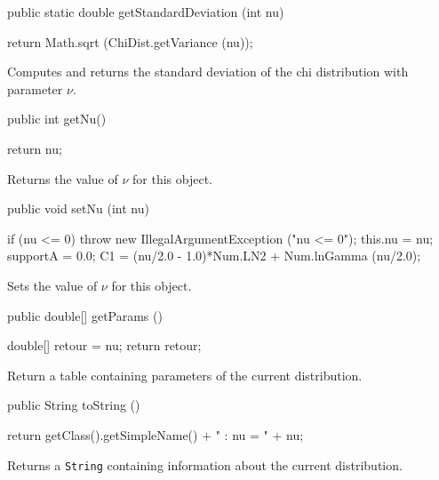 \begin{code}

   public static double getStandardDeviation (int nu)\begin{hide} {
      return Math.sqrt (ChiDist.getVariance (nu));
   }\end{hide}
\end{code}
\begin{tabb}  Computes and returns the standard deviation of the chi distribution
   with parameter $\nu$.
\end{tabb}
\begin{htmlonly}
\end{htmlonly}
\begin{code}

   public int getNu()\begin{hide} {
      return nu;
   }
\end{hide}
\end{code}
  \begin{tabb}
  Returns the value of $\nu$ for this object.
 \end{tabb}
\begin{code}

   public void setNu (int nu)\begin{hide} {
      if (nu <= 0)
         throw new IllegalArgumentException ("nu <= 0");
      this.nu = nu;
      supportA = 0.0;
      C1 = (nu/2.0 - 1.0)*Num.LN2 + Num.lnGamma (nu/2.0);
   }\end{hide}
\end{code}
  \begin{tabb}
  Sets the value of $\nu$ for this object.
 \end{tabb}
\begin{code}

   public double[] getParams ()\begin{hide} {
      double[] retour = {nu};
      return retour;
   }\end{hide}
\end{code}
\begin{tabb}
   Return a table containing parameters of the current distribution.
\end{tabb}
\begin{hide}\begin{code}

   public String toString ()\begin{hide} {
      return getClass().getSimpleName() + " : nu = " + nu;
   }\end{hide}
\end{code}
\begin{tabb}
   Returns a \texttt{String} containing information about the current distribution.
\end{tabb}\end{hide}
\begin{code}\begin{hide}
}\end{hide}
\end{code}

